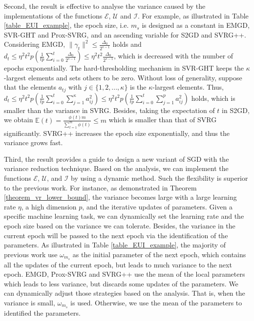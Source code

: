 \documentclass[letterpaper]{article}
\begin{document}
Second, the result is effective to analyse the variance caused by the  implementations of the functions $\mathcal{E}$, $\mathcal{U}$ and $\mathcal{I}$. For example, as illustrated in Table \ref{table_EUI_example}, the epoch size, i.e. $m_s$ is designed as a constant in EMGD, SVR-GHT and Prox-SVRG, and  an ascending variable for  S2GD and SVRG++. Considering EMGD,  $\parallel \gamma_t \parallel^2 \le \frac{\Delta_0}{2^{s-1}}$ holds and $d_t\le \eta^2 t^2 p \left( \frac{1}{tp}\sum\limits_{i=0}^t   \frac{\Delta_0}{2^{s-1}} \right)\le \eta^2t^2 \frac{\Delta_0}{2^{s-1}}$, which is decreased with the number of epochs exponentially. The hard-thresholding mechanism in SVR-GHT keeps the $\kappa$-largest elements and sets others to be zero. Without loss of generality, suppose that the elements $a_{tj}$ with $j\in\{1,2, ..., \kappa\}$ is the $\kappa$-largest elements. Thus, $d_t \le \eta^2 t^2p  \left( \frac{1}{tp}\sum\limits_{i=0}^t   \sum\limits_{j=1}^{\kappa}   a_{ij}^2 \right) \le \eta^2 t^2p  \left( \frac{1}{tp}\sum\limits_{i=0}^t   \sum\limits_{j=1}^p   a_{ij}^2 \right)$ holds, which is smaller than the variance in SVRG. Besides, taking the expectation of $t$ in S2GD, we obtain $\mathbb{E}(t)=\frac{\phi(t)m}{\sum_{t=1}^m \phi(t)} \le m$ which is smaller than that of SVRG significantly. SVRG++ increases the epoch size exponentially, and thus the variance grows fast.  

Third, the result provides a guide to design a new variant of SGD with the variance reduction technique.   Based on the analysis, we can implement the functions  $\mathcal{E}$, $\mathcal{U}$, and $\mathcal{I}$ by using a dynamic method. Such the flexibility  is superior to the previous work.  For instance, as demonstrated in Theorem \ref{theorem_vr_lower_bound}, the variance becomes large with a large learning rate $\eta$, a high dimension $p$, and the iterative updates of parameters.  Given a specific machine learning task, we can dynamically set  the learning rate and the epoch size based on the variance we can tolerate. Besides, the variance in the current epoch will be passed to the next epoch via the identification of the parameters. As illustrated in Table \ref{table_EUI_example},  the majority of previous work use $\omega_{m_s}$ as the initial parameter of the next epoch, which contains all the updates of the current epoch, but leads to much variance to the next epoch. EMGD, Prox-SVRG and SVRG++ use the mean of  the local parameters which leads to less variance, but discards some updates of the parameters. We can dynamically adjust those strategies based on the analysis. That is, when the variance is small, $\omega_{m_s}$ is used. Otherwise, we use the mean of the parameters to identified the parameters. 
\end{document}
